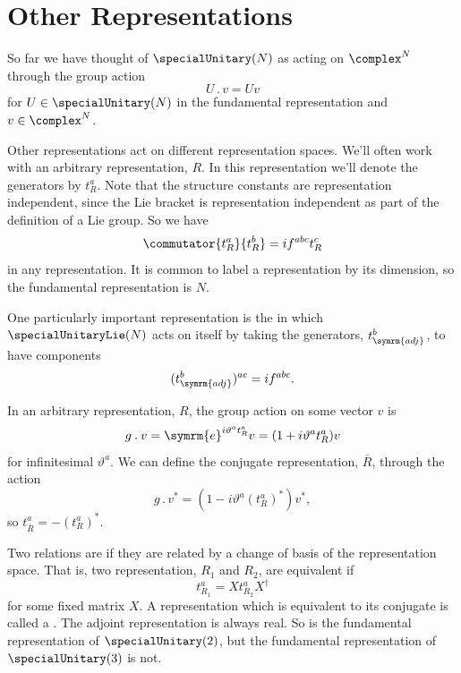 \documentclass[fleqn]{NotesClass}
\newcommand{\e}{\symrm{e}}
\newcommand{\hermit}{\dagger}
\newcommand{\action}{\mathbin{.}}
\newcommand{\adj}{\symrm{adj}}
\begin{document}
    \section{Other Representations}
    So far we have thought of \(\specialUnitary(N)\) as acting on \(\complex^N\) through the group action
    \begin{equation}
        U \action v = Uv
    \end{equation}
    for \(U \in \specialUnitary(N)\) in the fundamental representation and \(v \in \complex^N\).
    
    Other representations act on different representation spaces.
    We'll often work with an arbitrary representation, \(R\).
    In this representation we'll denote the generators by \(t_R^a\).
    Note that the structure constants are representation independent, since the Lie bracket is representation independent as part of the definition of a Lie group.
    So we have
    \begin{equation}
        \commutator{t_R^a}{t_R^b} = if^{abc}t_R^c
    \end{equation}
    in any representation.
    It is common to label a representation by its dimension, so the fundamental representation is \(N\).
    
    One particularly important representation is the  in which \(\specialUnitaryLie(N)\) acts on itself by taking the generators, \(t_{\adj}^b\), to have components
    \begin{equation}
        (t_{\adj}^b)^{ac} = if^{abc}.
    \end{equation}
    
    In an arbitrary representation, \(R\), the group action on some vector \(v\) is
    \begin{equation}
        g \action v = \e^{i\vartheta^at_R^a}v = (1 + i\vartheta^at_R^a)v
    \end{equation}
    for infinitesimal \(\vartheta^a\).
    We can define the conjugate representation, \(\overline{R}\), through the action
    \begin{equation}
        g \action v^* = (1 - i\vartheta^a(t_R^a)^*)v^*,
    \end{equation}
    so \(t_{\overline{R}}^a = -(t_R^a)^*\).
    
    Two relations are  if they are related by a change of basis of the representation space.
    That is, two representation, \(R_1\) and \(R_2\), are equivalent if
    \begin{equation}
        t_{R_1}^a = Xt_{R_2}^aX^\hermit
    \end{equation}
    for some fixed matrix \(X\).
    A representation which is equivalent to its conjugate is called a .
    The adjoint representation is always real.
    So is the fundamental representation of \(\specialUnitary(2)\), but the fundamental representation of \(\specialUnitary(3)\) is not.
    
\end{document}
